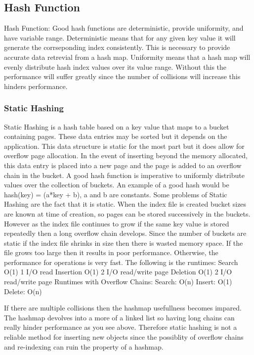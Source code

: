 \documentclass[letterpaper, 12pt]{article}
\renewcommand{\includegraphics}[2][]{\fbox{}}
\begin{document}
\subsection{Hash Function}
Hash Function:
Good hash functions are deterministic, provide uniformity, and have variable range. Deterministic means that for any given key value it will generate the corrseponding index consistently. This is necessary to provide accurate data retrevial from a hash map. Uniformity means that a hash map will evenly distribute hash index values over its value range. Without this the performance will suffer greatly since the number of collisions will increase this hinders performance. 
\subsubsection{Static Hashing}
Static Hashing is a hash table based on a key value that maps to a bucket containing pages. These data entries may be sorted but it depends on the application. This data structure is static for the most part but it does allow for overflow page allocation. In the event of inserting beyond the memory allocated, this data entry is placed into a new page and the page is added to an overflow chain in the bucket.
A good hash function is imperative to uniformly distribute values over the collection of buckets. An example of a good hash would be hash(key) = (a*key + b), a and b are constants. Some problems of Static Hashing are the fact that it is static. When the index file is created bucket sizes are known at time of creation, so pages can be stored successively in the buckets. However as the index file continues to grow if the same key value is stored repeatedly then a long overflow chain develops. Since the number of buckets are static if the index file shrinks in size then there is wasted memory space. If the file grows too large then it results in poor performance. Otherwise, the performance for operations is very fast. The following is the runtimes:
Search O(1) 1 I/O read
Insertion O(1) 2 I/O read/write page
Deletion O(1) 2 I/O read/write page
Runtimes with Overflow Chains:
Search: O(n)
Insert: O(1)
Delete: O(n)

If there are multiple collisions then the hashmap usefullness becomes impared. The hashmap devolves into a more
of a linked list so having long chains can really hinder performance as you see above. Therefore static hashing
is not a reliable method for inserting new objects since the possiblity of overflow chains and re-indexing can
ruin the property of a hashmap.
\end{document}

